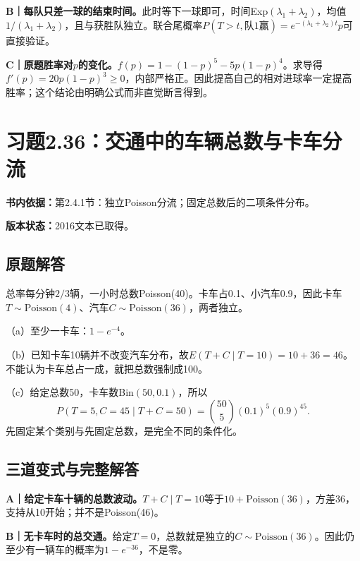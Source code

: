 \documentclass[
  11pt,
  a4paper,
  UTF8,fontset=fandol]{ctexart}
\let\OldSection\section
\renewcommand{\section}{\Needspace{7\baselineskip}\OldSection}
\let\OldSubsection\subsection
\renewcommand{\subsection}{\Needspace{5\baselineskip}\OldSubsection}
\begin{document}
\textbf{B｜每队只差一球的结束时间。}此时等下一球即可，时间Exp\((\lambda_1+\lambda_2)\)，均值\(1/(\lambda_1+\lambda_2)\)，且与获胜队独立。联合尾概率\(P(T>t,\text{队1赢})=e^{-(\lambda_1+\lambda_2)t}p\)可直接验证。

\textbf{C｜原题胜率对\(p\)的变化。}\(f(p)=1-(1-p)^5-5p(1-p)^4\)。求导得\(f'(p)=20p(1-p)^3\ge0\)，内部严格正。因此提高自己的相对进球率一定提高胜率；这个结论由明确公式而非直觉断言得到。

\newpage

\section{习题2.36：交通中的车辆总数与卡车分流}\label{ux4e60ux98982.36ux4ea4ux901aux4e2dux7684ux8f66ux8f86ux603bux6570ux4e0eux5361ux8f66ux5206ux6d41}

\textbf{书内依据：}第2.4.1节：独立Poisson分流；固定总数后的二项条件分布。

\textbf{版本状态：}2016文本已取得。

\subsection{原题解答}\label{ux539fux9898ux89e3ux7b54-35}

总率每分钟\(2/3\)辆，一小时总数Poisson(40)。卡车占0.1、小汽车0.9，因此卡车\(T\sim\mathrm{Poisson}(4)\)、汽车\(C\sim\mathrm{Poisson}(36)\)，两者独立。

（a）至少一卡车：\(\boxed{1-e^{-4}}\)。

（b）已知卡车10辆并不改变汽车分布，故\(E(T+C\mid T=10)=10+36=\boxed{46}\)。不能认为卡车总占一成，就把总数强制成100。

（c）给定总数50，卡车数Bin\((50,0.1)\)，所以
\[\boxed{P(T=5,C=45\mid T+C=50)=\binom{50}{5}(0.1)^5(0.9)^{45}.}\]
先固定某个类别与先固定总数，是完全不同的条件化。

\subsection{三道变式与完整解答}\label{ux4e09ux9053ux53d8ux5f0fux4e0eux5b8cux6574ux89e3ux7b54-35}

\textbf{A｜给定卡车十辆的总数波动。}\(T+C\mid T=10\)等于\(10+\mathrm{Poisson}(36)\)，方差36，支持从10开始；并不是Poisson(46)。

\textbf{B｜无卡车时的总交通。}给定\(T=0\)，总数就是独立的\(C\sim\mathrm{Poisson}(36)\)。因此仍至少有一辆车的概率为\(1-e^{-36}\)，不是零。
\end{document}
